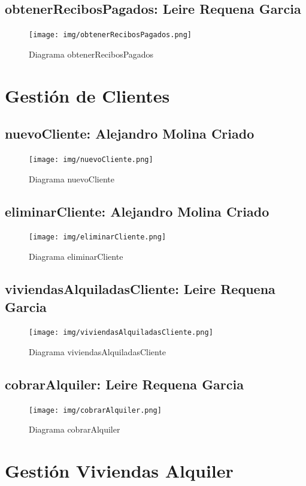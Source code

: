 \subsection{obtenerRecibosPagados: Leire Requena Garcia}
\begin{figure}[!h]
  \centering
    \texttt{[image: img/obtenerRecibosPagados.png]}
    \caption{Diagrama obtenerRecibosPagados}
\end{figure}

\pagebreak
\section{Gestión de Clientes}
\subsection{nuevoCliente: Alejandro Molina Criado}
\begin{figure}[!h]
  \centering
    \texttt{[image: img/nuevoCliente.png]}
    \caption{Diagrama nuevoCliente}
\end{figure}

\pagebreak
\subsection{eliminarCliente: Alejandro Molina Criado}
\begin{figure}[!h]
  \centering
    \texttt{[image: img/eliminarCliente.png]}
    \caption{Diagrama eliminarCliente}
\end{figure}

\pagebreak
\subsection{viviendasAlquiladasCliente: Leire Requena Garcia}
\begin{figure}[!h]
  \centering
    \texttt{[image: img/viviendasAlquiladasCliente.png]}
    \caption{Diagrama viviendasAlquiladasCliente}
\end{figure}

\subsection{cobrarAlquiler: Leire Requena Garcia}
\begin{figure}[!h]
  \centering
    \texttt{[image: img/cobrarAlquiler.png]}
    \caption{Diagrama cobrarAlquiler}
\end{figure}

\section{Gestión Viviendas Alquiler}
